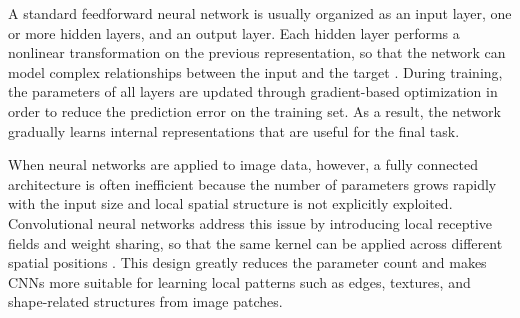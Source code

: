 \par A standard feedforward neural network is usually organized as an input
layer, one or more hidden layers, and an output layer. Each hidden layer
performs a nonlinear transformation on the previous representation, so that the
network can model complex relationships between the input and the target
\cite[pp.~164--223]{goodfellow2016deep}. During training, the parameters of all
layers are updated through gradient-based optimization in order to reduce the
prediction error on the training set. As a result, the network gradually learns
internal representations that are useful for the final task.

\par When neural networks are applied to image data, however, a fully connected
architecture is often inefficient because the number of parameters grows rapidly
with the input size and local spatial structure is not explicitly exploited.
Convolutional neural networks address this issue by introducing local receptive
fields and weight sharing, so that the same kernel can be applied across
different spatial positions \cite{lecun2002gradient}. This design greatly
reduces the parameter count and makes CNNs more suitable for learning local
patterns such as edges, textures, and shape-related structures from image
patches.


